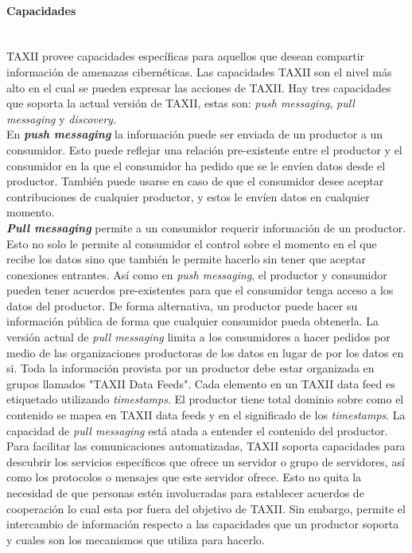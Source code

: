 \paragraph{Capacidades}\ \\

TAXII provee capacidades específicas para aquellos que desean compartir 
información de amenazas cibernéticas. Las capacidades TAXII son el nivel más 
alto en el cual se pueden expresar las acciones de TAXII. Hay tres capacidades 
que soporta la actual versión de TAXII, estas son: \textit{push messaging}, \textit{pull 
messaging} y \textit{discovery}.\\

En \textit{\textbf{push messaging}} la información puede ser enviada de un productor a un 
consumidor. Esto puede reflejar una relación pre-existente entre el productor y 
el consumidor en la que el consumidor ha pedido que se le envíen datos desde el 
productor. También puede usarse en caso de que el consumidor desee aceptar 
contribuciones de cualquier productor, y estos le envíen datos en cualquier 
momento.\\

\textit{\textbf{Pull messaging}} permite a un consumidor requerir información de un productor. 
Esto no solo le permite al consumidor el control sobre el momento en el que 
recibe los datos sino que también le permite hacerlo sin tener que aceptar 
conexiones entrantes. Así como en \textit{push messaging}, el productor y consumidor 
pueden tener acuerdos pre-existentes para que el consumidor tenga acceso a los 
datos del productor. De forma alternativa, un productor puede hacer su 
información pública de forma que cualquier consumidor pueda obtenerla. La 
versión actual de \textit{pull messaging} limita a los consumidores a hacer pedidos por 
medio de las organizaciones productoras de los datos en lugar de por los datos 
en si. Toda la información provista por un productor debe estar organizada en 
grupos llamados "TAXII Data Feeds". Cada elemento en un TAXII data feed es 
etiquetado utilizando \textit{timestamps}. El productor tiene total dominio sobre como el 
contenido se mapea en TAXII data feeds y en el significado de los \textit{timestamps}. La 
capacidad de \textit{pull messaging} está atada a entender el contenido del productor.\\

Para facilitar las comunicaciones automatizadas, TAXII soporta capacidades para 
descubrir los servicios específicos que ofrece un servidor o grupo de 
servidores, así como los protocolos o mensajes que este servidor ofrece. Esto no 
quita la necesidad de que personas estén involucradas para establecer acuerdos de 
cooperación lo cual esta por fuera del objetivo de TAXII. Sin embargo, permite 
el intercambio de información respecto a las capacidades que un productor 
soporta y cuales son los mecanismos que utiliza para hacerlo.

